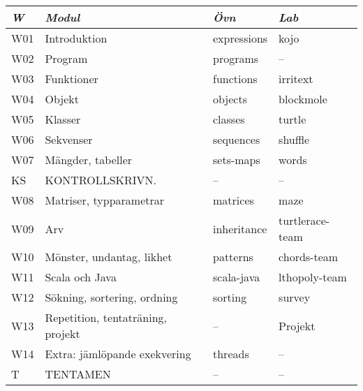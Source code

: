 \begin{tabular}{l|l|l|l}
\textit{W} & \textit{Modul} & \textit{Övn} & \textit{Lab} \\ \hline \hline
W01 & Introduktion & expressions & kojo \\
W02 & Program & programs & -- \\
W03 & Funktioner & functions & irritext \\
W04 & Objekt & objects & blockmole \\
W05 & Klasser & classes & turtle \\
W06 & Sekvenser & sequences & shuffle \\
W07 & Mängder, tabeller & sets-maps & words \\
KS & KONTROLLSKRIVN. & -- & -- \\
W08 & Matriser, typparametrar & matrices & maze \\
W09 & Arv & inheritance & turtlerace-team \\
W10 & Mönster, undantag, likhet & patterns & chords-team \\
W11 & Scala och Java & scala-java & lthopoly-team \\
W12 & Sökning, sortering, ordning & sorting & survey \\
W13 & Repetition, tentaträning, projekt & -- & Projekt \\
W14 & Extra: jämlöpande exekvering & threads & -- \\
T & TENTAMEN & -- & -- \\
\end{tabular}
